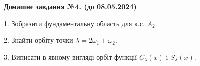 \documentclass[11pt,fleqn]{article}
\begin{document}
\begin{center}
\LARGE \bf
Домашнє завдання №4. (до 08.05.2024)
\end{center}

1. Зобразити фундаментальну область для к.с. $A_2$.

2. Знайти орбіту точки $\lambda=2\omega_1+\omega_2$.

3. Виписати в явному вигляді орбіт-функції $C_{\lambda}(x)$ і $S_{\lambda}(x)$.
\end{document}
